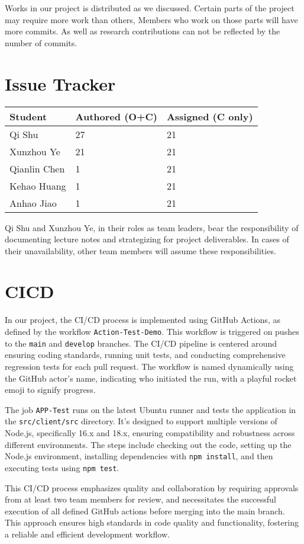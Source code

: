 \documentclass{article}
\begin{document}
Works in our project is distributed as we discussed. Certain parts of the
project may require more work than others, Members who work on those parts will
have more commits. As well as research contributions can not be reflected by the
number of commits.


\section{Issue Tracker}

\begin{table}[H]
  \centering
  \begin{tabular}{lll}
    \toprule
    \textbf{Student}   & \textbf{Authored (O+C)} & \textbf{Assigned (C only)} \\
    \midrule
    Qi Shu       & 27                & 21                   \\
    Xunzhou Ye   & 21                & 21                   \\
    Qianlin Chen & 1                 & 21                   \\
    Kehao Huang  & 1                 & 21                   \\
    Anhao Jiao   & 1                 & 21                   \\
    \bottomrule
  \end{tabular}
\end{table}


Qi Shu and Xunzhou Ye, in their roles as team leaders, bear the responsibility
of documenting lecture notes and strategizing for project deliverables. In cases
of their unavailability, other team members will assume these responsibilities.

\section{CICD}

In our project, the CI/CD process is implemented using GitHub Actions, as
defined by the workflow \texttt{Action-Test-Demo}. This workflow is triggered on
pushes to the \texttt{main} and \texttt{develop} branches. The CI/CD pipeline is
centered around ensuring coding standards, running unit tests, and conducting
comprehensive regression tests for each pull request. The workflow is named
dynamically using the GitHub actor's name, indicating who initiated the run,
with a playful rocket emoji to signify progress.

The job \texttt{APP-Test} runs on the latest Ubuntu runner and tests the application
in the \texttt{src/client/src} directory. It's designed to support multiple
versions of Node.js, specifically 16.x and 18.x, ensuring compatibility and
robustness across different environments. The steps include checking out the
code, setting up the Node.js environment, installing dependencies with
\texttt{npm install}, and then executing tests using \texttt{npm test}.

This CI/CD process emphasizes quality and collaboration by requiring approvals
from at least two team members for review, and necessitates the successful
execution of all defined GitHub actions before merging into the main branch.
This approach ensures high standards in code quality and functionality,
fostering a reliable and efficient development workflow.
\end{document}
